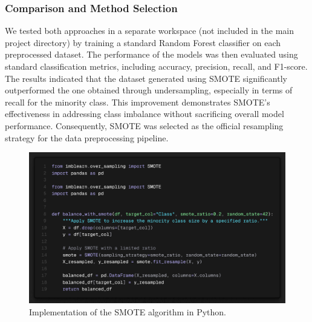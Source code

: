 \documentclass[10pt]{article}
\begin{document}
\subsubsection*{Comparison and Method Selection}
We tested both approaches in a separate workspace (not included in the main project directory) by training a standard Random Forest classifier on each preprocessed dataset. The performance of the models was then evaluated using standard classification metrics, including accuracy, precision, recall, and F1-score.
The results indicated that the dataset generated using SMOTE significantly outperformed the one obtained through undersampling, especially in terms of recall for the minority class. This improvement demonstrates SMOTE’s effectiveness in addressing class imbalance without sacrificing overall model performance. Consequently, SMOTE was selected as the official resampling strategy for the data preprocessing pipeline.
\begin{figure}[h!]
	\centering
	\includegraphics[height = 0.30\textheight]{img/SMOTE.png}
	\caption{Implementation of the SMOTE algorithm in Python.}
\end{figure}
\end{document}

